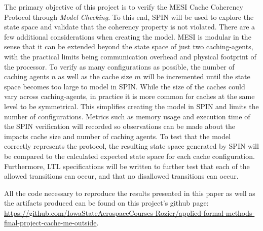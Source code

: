 \documentclass[12pt]{article}
\begin{document}
The primary objective of this project is to verify the MESI Cache Coherency Protocol through \textit{Model Checking}. To this end, SPIN will be used to explore the state space and validate that the coherency property is not violated. There are a few additional considerations when creating the model. MESI is modular in the sense that it can be extended beyond the state space of just two caching-agents, with the practical limits being communication overhead and physical footprint of the processor. To verify as many configurations as possible, the number of caching agents $n$ as well as the cache size $m$ will be incremented until the state space becomes too large to model in SPIN. While the size of the caches could vary across caching-agents, in practice it is more common for caches at the same level to be symmetrical. This simplifies creating the model in SPIN and limits the number of configurations. Metrics such as memory usage and execution time of the SPIN verification will recorded so observations can be made about the impacts cache size and number of caching agents. To test that the model correctly represents the protocol, the resulting state space generated by SPIN will be compared to the calculated expected state space for each cache configuration. Furthermore, LTL specifications will be written to further test that each of the allowed transitions can occur, and that no disallowed transitions can occur.

All the code necessary to reproduce the results presented in this paper as well as the artifacts produced can be found on this project's github page: \href{https://github.com/IowaStateAerospaceCourses-Rozier/applied-formal-methods-final-project-cache-me-outside}{https://github.com/IowaStateAerospaceCourses-Rozier/applied-formal-methods-final-project-cache-me-outside}.

\clearpage{
\printbibliography
}
\end{document}
